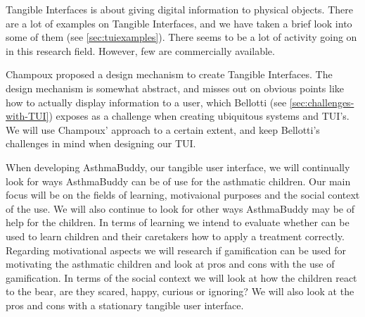 Tangible Interfaces is about giving digital information to physical objects. There are a lot of examples on Tangible Interfaces, and we have taken a brief look into some of them (see \ref{sec:tuiexamples}). There seems to be a lot of activity going on in this research field. However, few are commercially available. 

Champoux proposed a design mechanism to create Tangible Interfaces. The design mechanism is somewhat abstract, and misses out on obvious points like how to actually display information to a user, which Bellotti \etal{} (see \ref{sec:challenges-with-TUI}) exposes as a challenge when creating ubiquitous systems and TUI's. We will use Champoux' approach to a certain extent, and keep Bellotti's challenges in mind when designing our TUI.   

When developing AsthmaBuddy, our tangible user interface, we will continually look for ways AsthmaBuddy can be of use for the asthmatic children. Our main focus will be on the fields of learning, motivaional purposes and the social context of the use. We will also continue to look for other ways AsthmaBuddy may be of help for the children. 
In terms of learning we intend to evaluate whether \buddy{} can be used to learn children and their caretakers how to apply a treatment correctly.
Regarding motivational aspects we will research if gamification can be used for motivating the asthmatic children and look at pros and cons with the use of gamification. 
In terms of the social context we will look at how the children react to the bear, are they scared, happy, curious or ignoring? We will also look at the pros and cons with a stationary tangible user interface. 

 

